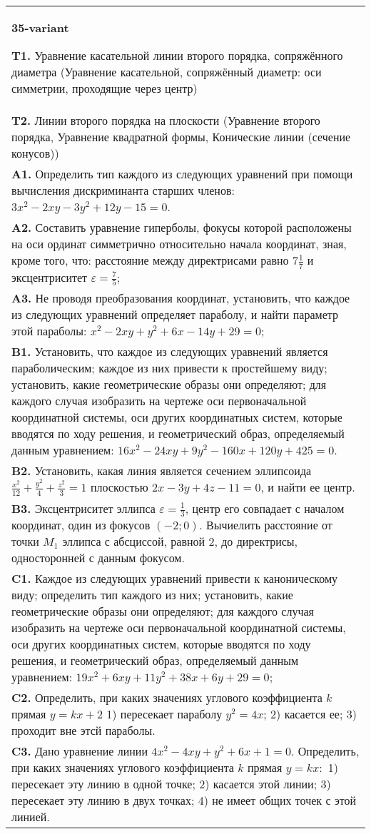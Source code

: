 \documentclass{article}
\begin{document}
\begin{tabular}{m{17cm}}
\textbf{35-variant}
\newline

\textbf{T1.} Уравнение касательной линии второго порядка, сопряжённого диаметра (Уравнение касательной, сопряжённый диаметр: оси симметрии, проходящие через центр) \\
\textbf{T2.} Линии второго порядка на плоскости (Уравнение второго порядка, Уравнение квадратной формы, Конические линии (сечение конусов)) \\
\textbf{A1.} Определить тип каждого из следующих уравнений при помощи вычисления дискриминанта старших членов: $3 x^2-2 x y-3 y^2+12 y-15=0$. \\
\textbf{A2.} Составить уравнение гиперболы, фокусы которой расположены на оси ординат симметрично относительно начала координат, зная, кроме того, что: расстояние между директрисами равно $7 \frac{1}{7}$ и эксцентриситет $\varepsilon=\frac{7}{5}$; \\
\textbf{A3.} Не проводя преобразования координат, установить, что каждое из следующих уравнений определяет параболу, и найти параметр этой параболы: $x^2-2 x y+y^2+6 x-14 y+29=0$; \\
\textbf{B1.} Установить, что каждое из следующих уравнений является параболическим; каждое из них привести к простейшему виду; установить, какие геометрические образы они определяют; для каждого случая изобразить на чертеже оси первоначальной координатной системы, оси других координатных систем, которые вводятся по ходу решения, и геометрический образ, определяемый данным уравнением: $16 x^2-24 x y+9 y^2-160 x+120 y+425=0$. \\
\textbf{B2.} Установить, какая линия является сечением эллипсоида $\frac{x^2}{12}+\frac{y^2}{4}+\frac{z^2}{3}=1$ плоскостью $2 x-3 y+4 z-11=0$, и найти ее центр. \\
\textbf{B3.} Эксцентриситет эллипса $\varepsilon=\frac{1}{3}$, центр его совпадает с началом координат, один из фокусов $(-2 ; 0)$. Вычиелить расстояние от точки $M_1$ эллипса с абсциссой, равной 2, до директрисы, односторонней с данным фокусом. \\
\textbf{C1.} Каждое из следующих уравнений привести к каноническому виду; определить тип каждого из них; установить, какие геометрические образы они определяют; для каждого случая изобразить на чертеже оси первоначальной координатной системы, оси других координатных систем, которые вводятся по ходу решения, и геометрический образ, определяемый данным уравнением: $19 x^2+6 x y+11 y^2+38 x+6 y+29=0$; \\
\textbf{C2.} Определить, при каких значениях углового коэффициента $k$ прямая $y=k x+2$ 1) пересекает параболу $y^2=4 x$; 2) касается ее; 3) проходит вне этсй параболы. \\
\textbf{C3.} Дано уравнение линии $4 x^2-4 x y+y^2+6 x+1=0$. Определить, при каких значениях углового коэффициента $k$ прямая $y=k x:$ 1) пересекает эту линию в одной точке; 2) касается этой линии; 3) пересекает эту линию в двух точках; 4) не имеет общих точек с этой линией. \\

\end{tabular}
\vspace{1cm}
\end{document}
